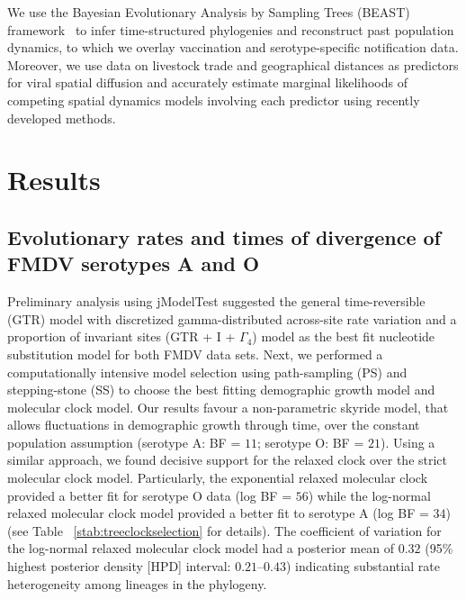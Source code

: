 \documentclass[10pt]{article}
\begin{document}
We use the Bayesian Evolutionary Analysis by Sampling Trees (BEAST) framework~\cite{beast2012} to infer time-structured phylogenies and reconstruct past population dynamics, to which we overlay vaccination and serotype-specific notification data.
Moreover, we use data on livestock trade and geographical distances as predictors for viral spatial diffusion and accurately estimate marginal likelihoods of competing spatial dynamics models involving each predictor using recently developed methods.


\section*{Results}

\subsection*{Evolutionary rates and times of divergence of FMDV serotypes A and O}

Preliminary analysis using jModelTest suggested the general time-reversible (GTR) model with discretized gamma-distributed across-site rate variation and a proportion of invariant sites (GTR + I + $\Gamma_{4}$) model as the best fit nucleotide substitution model for both FMDV data sets.
Next, we performed a computationally intensive model selection using path-sampling (PS) and stepping-stone (SS) to choose the best fitting demographic growth model and molecular clock model.
Our results favour a non-parametric skyride model, that allows fluctuations in demographic growth through time, over the constant population assumption (serotype A: BF = $11$; serotype O: BF = $21$).
Using a similar approach, we  found decisive support for the relaxed clock over the strict molecular clock model.
Particularly, the exponential relaxed molecular clock provided a better fit for serotype O data (log BF = $56$) while the log-normal relaxed molecular clock model provided a better fit to serotype A (log BF = $34$) (see Table ~\ref{stab:treeclockselection} for details). 
The coefficient of variation for the log-normal relaxed molecular clock model had a posterior mean of $0.32$ (95\% highest posterior density [HPD] interval: $0.21$--$0.43$) indicating substantial rate heterogeneity among lineages in the phylogeny.
\end{document}
